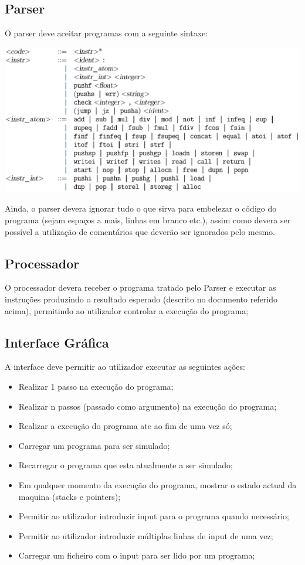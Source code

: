 \documentclass{report}
\begin{document}
\subsection{Parser}

\quad O parser deve aceitar programas com a seguinte sintaxe:

\begin{center}
\includegraphics[width=\textwidth]{sintaxe.png}
\end{center}

\quad Ainda, o parser devera ignorar tudo o que sirva para embelezar o código do programa (sejam espaços a mais, linhas em branco etc.),
assim como devera ser possível a utilização de comentários que deverão ser ignorados pelo mesmo.

\subsection{Processador}

\quad O processador devera receber o programa tratado pelo Parser e executar as instruções produzindo o resultado
esperado (descrito no documento referido acima), permitindo ao utilizador controlar a execução do programa;

\subsection{Interface Gráfica}
\quad A interface deve permitir ao utilizador executar as seguintes ações:
\begin{itemize}
\item Realizar 1 passo na execução do programa;
\item Realizar n passos (passado como argumento) na execução do programa;
\item Realizar a execução do programa ate ao fim de uma vez só;
\item Carregar um programa para ser simulado;
\item Recarregar o programa que esta atualmente a ser simulado;
\item Em qualquer momento da execução do programa, mostrar o estado actual da maquina (stacks e pointers);
\item Permitir ao utilizador introduzir input para o programa quando necessário;
\item Permitir ao utilizador introduzir múltiplas linhas de input de uma vez;
\item Carregar um ficheiro com o input para ser lido por um programa;
\end{itemize}
\end{document}

